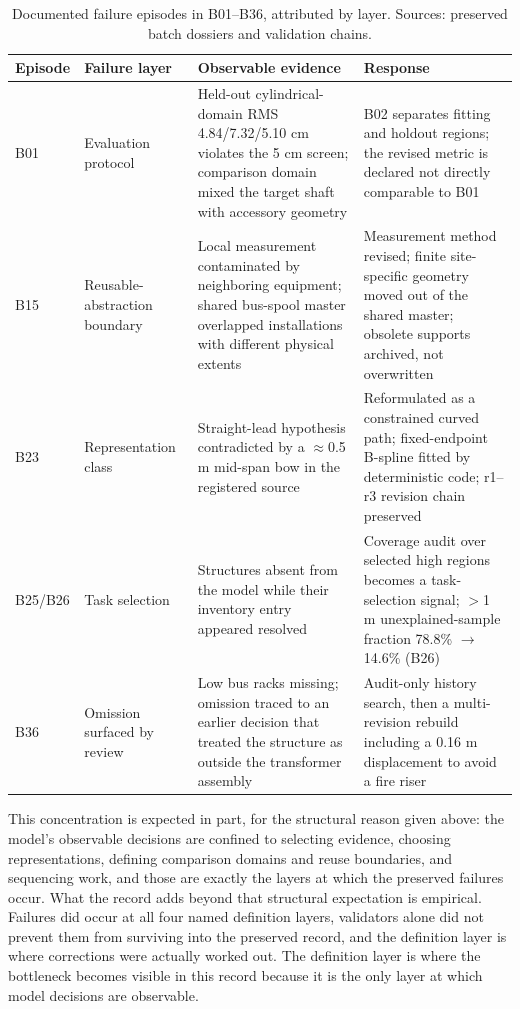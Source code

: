 \documentclass[10pt,a4paper]{article}
\begin{document}
\begin{table}[t]
\centering
\caption{Documented failure episodes in B01--B36, attributed by layer. Sources: preserved batch dossiers and validation chains.}
\label{tab:failures}
\small
\setlength{\tabcolsep}{5pt}
\renewcommand{\arraystretch}{1.12}
\begin{tabularx}{\textwidth}{@{}p{}p{}XX@{}}
\toprule
\textbf{Episode} & \textbf{Failure layer} & \textbf{Observable evidence} & \textbf{Response} \\
\midrule
B01 & Evaluation protocol & Held-out cylindrical-domain RMS 4.84/7.32/5.10 cm violates the 5 cm screen; comparison domain mixed the target shaft with accessory geometry & B02 separates fitting and holdout regions; the revised metric is declared not directly comparable to B01 \\
B15 & Reusable-abstraction boundary & Local measurement contaminated by neighboring equipment; shared bus-spool master overlapped installations with different physical extents & Measurement method revised; finite site-specific geometry moved out of the shared master; obsolete supports archived, not overwritten \\
B23 & Representation class & Straight-lead hypothesis contradicted by a $\approx$0.5 m mid-span bow in the registered source & Reformulated as a constrained curved path; fixed-endpoint B-spline fitted by deterministic code; r1--r3 revision chain preserved \\
B25/B26 & Task selection & Structures absent from the model while their inventory entry appeared resolved & Coverage audit over selected high regions becomes a task-selection signal; $>$1 m unexplained-sample fraction 78.8\% $\rightarrow$ 14.6\% (B26) \\
B36 & Omission surfaced by review & Low bus racks missing; omission traced to an earlier decision that treated the structure as outside the transformer assembly & Audit-only history search, then a multi-revision rebuild including a 0.16 m displacement to avoid a fire riser \\
\bottomrule
\end{tabularx}
\end{table}

This concentration is expected in part, for the structural reason given
above: the model's observable decisions are confined to selecting
evidence, choosing representations, defining comparison domains and
reuse boundaries, and sequencing work, and those are exactly the layers
at which the preserved failures occur. What the record adds beyond that
structural expectation is empirical. Failures did occur at all four
named definition layers, validators alone did not prevent them from
surviving into the preserved record, and the definition layer is where
corrections were actually worked out. The definition layer is where the
bottleneck becomes visible in this record because it is the only layer
at which model decisions are observable.
\end{document}
